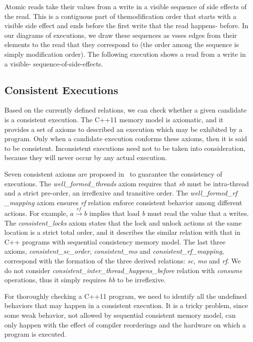 \documentclass[preprint, numbers, 10pt]{sigplanconf}
\begin{document}
Atomic reads take their values from a write in a visible sequence of side effects of the read. This is a contiguous part of themodification order that starts with a visible side effect and ends before the first write that the read happens- before. In our diagrams of executions, we draw these sequences as vsses edges from their elements to the read that they correspond to (the order among the sequence is simply modification order). The following execution shows a read from a write in a visible- sequence-of-side-effects.


\subsection{Consistent Executions}

Based on the currently defined relations, we can check whether a given 
candidate is a consistent execution. 
The C++11 memory model is axiomatic, and it provides a set of axioms 
to described an execution which may be exhibited by a program.
Only when a candidate execution conforms these axioms, then it is 
said to be consistent. Inconsistent executions need not to be taken into 
consideration, because they will never occur by any actual execution. 

Seven consistent axioms are proposed in~\citep{Batty:2011} to guarantee
the consistency of executions. 
The \textit{well\_formed\_threads} axiom requires that \textit{sb} must 
be intra-thread and a strict pre-order, an irreflexive and transitive order.
The \textit{well\_formed\_rf\\\_mapping} axiom ensures \textit{rf} relation
enforce consistent behavior among different actions. For example, 
$a \stackrel{rf}{\longrightarrow} b$ implies that load \textit{b}
must read the value that a writes. 
The \textit{consistent\_locks} axiom states that the lock and unlock actions
at the same location is a strict total order, and it describes the similar
relation with that in C++ programs with sequential consistency memory model. 
The last three axioms, \textit{consistent\_sc\_order}, \textit{consistent\_mo} 
and \textit{consistent\_rf\_mapping}, correspond with the formation of the 
three derived relations: \textit{sc}, \textit{mo} and \textit{rf}. 
We do not consider \textit{consistent\_inter\_thread\_happens\_before}
relation with \textit{consume} operations, thus it simply requires \textit{hb} to 
be irreflexive. 

For thoroughly checking a C++11 program, we need to identify all the undefined
behaviors that may happen in a consistent execution. It is a tricky problem, since 
some weak behavior, not allowed by sequential consistent memory model,
can only happen with the effect of compiler reorderings and the hardware on 
which a program is executed. 
\end{document}

